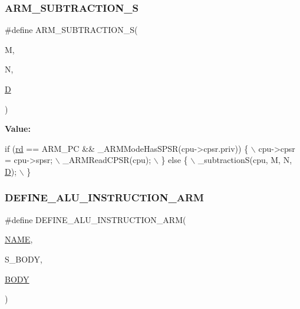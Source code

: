\subsubsection{\texorpdfstring{A\+R\+M\+\_\+\+S\+U\+B\+T\+R\+A\+C\+T\+I\+O\+N\+\_\+S}{ARM\_SUBTRACTION\_S}}
{\footnotesize\ttfamily \#define A\+R\+M\+\_\+\+S\+U\+B\+T\+R\+A\+C\+T\+I\+O\+N\+\_\+S(\begin{DoxyParamCaption}\item[{}]{M,  }\item[{}]{N,  }\item[{}]{\mbox{\hyperlink{_aes_8c_adef282f11138cda3d081cc21280a8d12}{D}} }\end{DoxyParamCaption})}

{\bfseries Value\+:}
\begin{DoxyCode}
\textcolor{keywordflow}{if} (\mbox{\hyperlink{isa-arm_8c_a555541ce18ed9b5fad657a06b22cb465}{rd}} == ARM\_PC && \_ARMModeHasSPSR(cpu->cpsr.priv)) \{ \(\backslash\)
        cpu->cpsr = cpu->spsr; \(\backslash\)
        \_ARMReadCPSR(cpu); \(\backslash\)
    \} \textcolor{keywordflow}{else} \{ \(\backslash\)
        \_subtractionS(cpu, M, N, \mbox{\hyperlink{_aes_8c_adef282f11138cda3d081cc21280a8d12}{D}}); \(\backslash\)
    \}
\end{DoxyCode}
\mbox{\label{isa-arm_8c_a10171ea841e3ba7eb45b27023d684608}} 
\subsubsection{\texorpdfstring{D\+E\+F\+I\+N\+E\+\_\+\+A\+L\+U\+\_\+\+I\+N\+S\+T\+R\+U\+C\+T\+I\+O\+N\+\_\+\+A\+RM}{DEFINE\_ALU\_INSTRUCTION\_ARM}}
{\footnotesize\ttfamily \#define D\+E\+F\+I\+N\+E\+\_\+\+A\+L\+U\+\_\+\+I\+N\+S\+T\+R\+U\+C\+T\+I\+O\+N\+\_\+\+A\+RM(\begin{DoxyParamCaption}\item[{}]{\mbox{\hyperlink{inflate_8h_a164ea0159d5f0b5f12a646f25f99eceaa67bc2ced260a8e43805d2480a785d312}{N\+A\+ME}},  }\item[{}]{S\+\_\+\+B\+O\+DY,  }\item[{}]{\mbox{\hyperlink{gzlog_8c_aa6bdf6a6d9916c343e1e17774d84a156}{B\+O\+DY}} }\end{DoxyParamCaption})}

